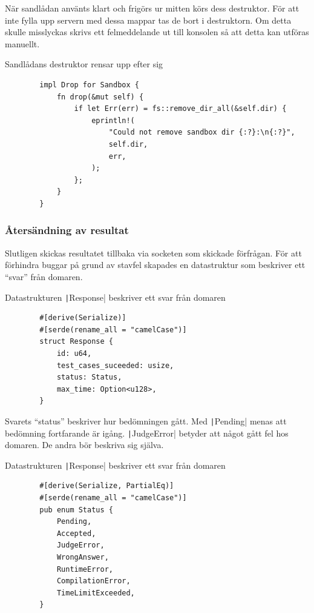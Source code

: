 \documentclass{article}
\begin{document}
När sandlådan använts klart och frigörs ur mitten körs dess destruktor. För att
inte fylla upp servern med dessa mappar tas de bort i destruktorn. Om detta
skulle misslyckas skrivs ett felmeddelande ut till konsolen så att detta kan
utföras manuellt.

\begin{listing}[H]
	\caption{Sandlådans destruktor rensar upp efter sig}
	\begin{verbatim}
		impl Drop for Sandbox {
			fn drop(&mut self) {
				if let Err(err) = fs::remove_dir_all(&self.dir) {
					eprintln!(
						"Could not remove sandbox dir {:?}:\n{:?}",
						self.dir,
						err,
					);
				};
			}
		}
	\end{verbatim}
\end{listing}

\subsubsection{Återsändning av resultat}

Slutligen skickas resultatet tillbaka via socketen som skickade förfrågan. För
att förhindra buggar på grund av stavfel skapades en datastruktur som beskriver
ett ``svar'' från domaren.

\begin{listing}[H]
	\caption{Datastrukturen \texttt|Response| beskriver ett svar från domaren}
	\begin{verbatim}
		#[derive(Serialize)]
		#[serde(rename_all = "camelCase")]
		struct Response {
			id: u64,
			test_cases_suceeded: usize,
			status: Status,
			max_time: Option<u128>,
		}
	\end{verbatim}
\end{listing}

Svarets ``status'' beskriver hur bedömningen gått. Med
\texttt|Pending| menas
att bedömning fortfarande är igång. \texttt|JudgeError| betyder att något gått
fel hos domaren. De andra bör beskriva sig själva.

\begin{listing}[H]
	\caption{Datastrukturen \texttt|Response| beskriver ett svar från domaren}
	\label{status-enum}
	\begin{verbatim}
		#[derive(Serialize, PartialEq)]
		#[serde(rename_all = "camelCase")]
		pub enum Status {
			Pending,
			Accepted,
			JudgeError,
			WrongAnswer,
			RuntimeError,
			CompilationError,
			TimeLimitExceeded,
		}
	\end{verbatim}
\end{listing}
\end{document}
